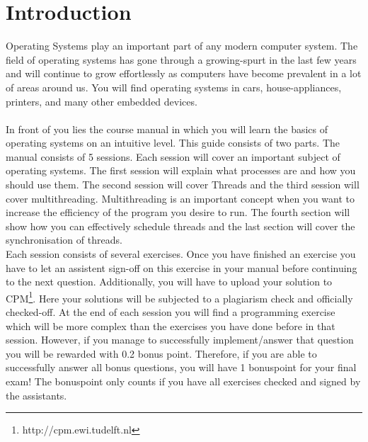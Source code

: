 \chapter{Introduction}\label{chap:introduction}
Operating Systems play an important part of any modern computer system. The field of operating systems has gone through a growing-spurt in the last few years and will continue to grow effortlessly as computers have become prevalent in a lot of areas around us. You will find operating systems in cars, house-appliances, printers, and many other embedded devices.\\
\\
In front of you lies the course manual in which you will learn the basics of operating systems on an intuitive level. This guide consists of two parts. The manual consists of 5 sessions. Each session will cover an important subject of operating systems. The first session will explain what processes are and how you should use them. The second session will cover Threads and the third session will cover multithreading. Multithreading is an important concept when you want to increase the efficiency of the program you desire to run. The fourth section will show how you can effectively schedule threads and the last section will cover the synchronisation of threads.\\

Each session consists of several exercises. Once you have finished an exercise you have to let an assistent sign-off on this exercise in your manual before continuing to the next question. Additionally, you will have to upload your solution to CPM\footnote{http://cpm.ewi.tudelft.nl}. Here your solutions will be subjected to a plagiarism check and officially checked-off. At the end of each session you will find a programming exercise which will be more complex than the exercises you have done before in that session. However, if you manage to successfully implement/answer that question you will be rewarded with 0.2 bonus point. Therefore, if you are able to successfully answer all bonus questions, you will have 1 bonuspoint for your final exam! The bonuspoint only counts if you have all exercises checked and signed by the assistants.\\  

